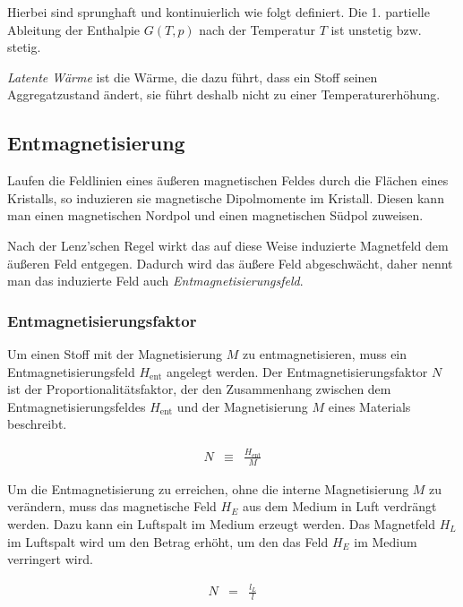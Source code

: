\documentclass[12pt,a4paper]{scrartcl}
\numberwithin{equation}{section} %
\renewcommand{\[}{} %
\renewcommand{\]}{\noindent} %
\begin{document}
Hierbei sind sprunghaft und kontinuierlich wie folgt definiert. Die 1.
partielle Ableitung der Enthalpie \(G(T,p)\) nach der Temperatur \(T\)
ist unstetig bzw. stetig.

\emph{Latente Wärme} ist die Wärme, die dazu führt, dass ein Stoff
seinen Aggregatzustand ändert, sie führt deshalb nicht zu einer
Temperaturerhöhung.

\hypertarget{entmagnetisierung}{%
\subsection{Entmagnetisierung}\label{entmagnetisierung}}

Laufen die Feldlinien eines äußeren magnetischen Feldes durch die
Flächen eines Kristalls, so induzieren sie magnetische Dipolmomente im
Kristall. Diesen kann man einen magnetischen Nordpol und einen
magnetischen Südpol zuweisen.

Nach der Lenz'schen Regel wirkt das auf diese Weise induzierte
Magnetfeld dem äußeren Feld entgegen. Dadurch wird das äußere Feld
abgeschwächt, daher nennt man das induzierte Feld auch
\emph{Entmagnetisierungsfeld}.

\hypertarget{entmagnetisierungsfaktor}{%
\subsubsection{Entmagnetisierungsfaktor}\label{entmagnetisierungsfaktor}}

Um einen Stoff mit der Magnetisierung \(M\) zu entmagnetisieren, muss
ein Entmagnetisierungsfeld \(H_\mathrm{ent}\) angelegt werden. Der
Entmagnetisierungsfaktor \(N\) ist der Proportionalitätsfaktor, der den
Zusammenhang zwischen dem Entmagnetisierungsfeldes \(H_\mathrm{ent}\)
und der Magnetisierung \(M\) eines Materials beschreibt.

\[
\begin{eqnarray}
    N &\equiv& \frac{H_\mathrm{ent}}{M} \label{defN}
\end{eqnarray}
\]

Um die Entmagnetisierung zu erreichen, ohne die interne Magnetisierung
\(M\) zu verändern, muss das magnetische Feld \(H_E\) aus dem Medium in
Luft verdrängt werden. Dazu kann ein Luftspalt im Medium erzeugt werden.
Das Magnetfeld \(H_L\) im Luftspalt wird um den Betrag erhöht, um den
das Feld \(H_E\) im Medium verringert wird.

\[
\begin{eqnarray}
    N &=& \frac{l_L}{l} \label{N}
\end{eqnarray}
\]
\end{document}
